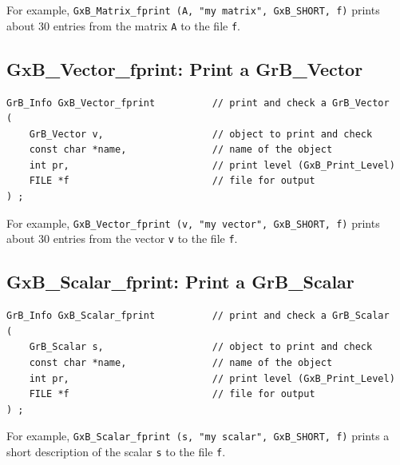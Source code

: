 For example, \verb'GxB_Matrix_fprint (A, "my matrix", GxB_SHORT, f)'
prints about 30 entries from the matrix \verb'A' to the file \verb'f'.


\newpage
\subsection{{\sf GxB\_Vector\_fprint:} Print a {\sf GrB\_Vector}}

\begin{mdframed}[userdefinedwidth=6in]
{\footnotesize
\begin{verbatim}
GrB_Info GxB_Vector_fprint          // print and check a GrB_Vector
(
    GrB_Vector v,                   // object to print and check
    const char *name,               // name of the object
    int pr,                         // print level (GxB_Print_Level)
    FILE *f                         // file for output
) ;
\end{verbatim} } \end{mdframed}

For example, \verb'GxB_Vector_fprint (v, "my vector", GxB_SHORT, f)'
prints about 30 entries from the vector \verb'v' to the file \verb'f'.

\subsection{{\sf GxB\_Scalar\_fprint:} Print a {\sf GrB\_Scalar}}

\begin{mdframed}[userdefinedwidth=6in]
{\footnotesize
\begin{verbatim}
GrB_Info GxB_Scalar_fprint          // print and check a GrB_Scalar
(
    GrB_Scalar s,                   // object to print and check
    const char *name,               // name of the object
    int pr,                         // print level (GxB_Print_Level)
    FILE *f                         // file for output
) ;
\end{verbatim} } \end{mdframed}

For example, \verb'GxB_Scalar_fprint (s, "my scalar", GxB_SHORT, f)'
prints a short description of the scalar \verb's' to the file \verb'f'.

